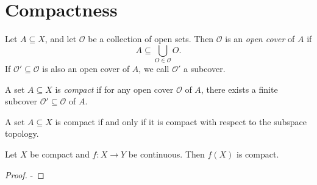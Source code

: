 \chapter{Compactness}
\begin{definition}\label{dfn:5.1}
	Let $A\subseteq X$, and let $\mathcal{O} $ be a collection of open sets. Then $\mathcal{O} $ is an \emph{open cover} of $A$ if
	\[
		A\subseteq \bigcup_{O\in \mathcal{O} } O
	.\]
	If $\mathcal{O} '\subseteq \mathcal{O} $ is also an open cover of $A$, we call $\mathcal{O} '$ a subcover.
\end{definition}
\begin{definition}[Compact]\label{dfn:5.2}
	A set $A\subseteq X$ is \emph{compact} if for any open cover $\mathcal{O} $ of $A$, there exists a finite subcover $\mathcal{O} '\subseteq \mathcal{O} $ of $A$.
\end{definition}
\begin{lemma}\label{lma:5.1}
	A set $A\subseteq X$ is compact if and only if it is compact with respect to the subspace topology.
\end{lemma}
\begin{proposition}\label{prp:5.1}
	Let $X$ be compact and $f : X \to Y$ be continuous. Then $f(X)$ is compact.
\end{proposition}
\begin{proof}
	-
\end{proof}

